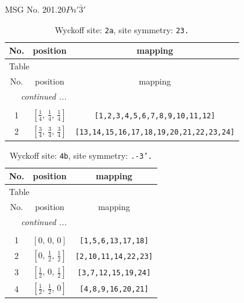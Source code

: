 \documentclass[fleqn,8pt]{jsarticle}
\begin{document}
\setcounter{MaxMatrixCols}{32}

\renewcommand{\tablename}{Table~}
\renewcommand{\figurename}{Figure~}
\begin{center}
\LARGE
MSG No. 201.20\quad$Pn'\bar{3}'$
\end{center}
\renewcommand{\arraystretch}{1.2}
\begin{longtable}{ccc}
\caption{Wyckoff site: {\tt 2a}, site symmetry: {\tt 23.}}
 \\
 \hline \hline
No. & position & mapping \\ \hline \endfirsthead

\multicolumn{2}{l}{\tablename\ \thetable{}} \\
 \hline \hline
No. & position & mapping \\ \hline \endhead

 \hline \hline
\multicolumn{2}{r}{\footnotesize\it continued ...} \\ \endfoot

 \hline \hline
\multicolumn{2}{r}{} \\ \endlastfoot

1 & $\left[ \frac{1}{4},\, \frac{1}{4},\, \frac{1}{4} \right]$ & {\tt [1,2,3,4,5,6,7,8,9,10,11,12]} \\ \hline
2 & $\left[ \frac{3}{4},\, \frac{3}{4},\, \frac{3}{4} \right]$ & {\tt [13,14,15,16,17,18,19,20,21,22,23,24]} \\
\end{longtable}
\renewcommand{\arraystretch}{1.2}
\begin{longtable}{ccc}
\caption{Wyckoff site: {\tt 4b}, site symmetry: {\tt .-3'.}}
 \\
 \hline \hline
No. & position & mapping \\ \hline \endfirsthead

\multicolumn{2}{l}{\tablename\ \thetable{}} \\
 \hline \hline
No. & position & mapping \\ \hline \endhead

 \hline \hline
\multicolumn{2}{r}{\footnotesize\it continued ...} \\ \endfoot

 \hline \hline
\multicolumn{2}{r}{} \\ \endlastfoot

1 & $\left[ 0,\, 0,\, 0 \right]$ & {\tt [1,5,6,13,17,18]} \\ \hline
2 & $\left[ 0,\, \frac{1}{2},\, \frac{1}{2} \right]$ & {\tt [2,10,11,14,22,23]} \\ \hline
3 & $\left[ \frac{1}{2},\, 0,\, \frac{1}{2} \right]$ & {\tt [3,7,12,15,19,24]} \\ \hline
4 & $\left[ \frac{1}{2},\, \frac{1}{2},\, 0 \right]$ & {\tt [4,8,9,16,20,21]} \\
\end{longtable}
\end{document}
